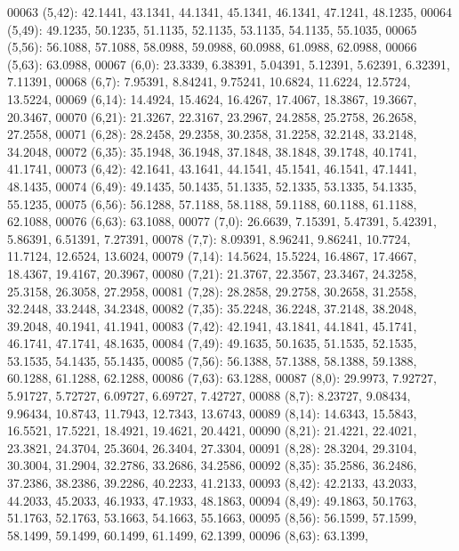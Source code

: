\begin{DoxyCode}
00063       (5,42): 42.1441, 43.1341, 44.1341, 45.1341, 46.1341, 47.1241, 48.1235,
00064       (5,49): 49.1235, 50.1235, 51.1135, 52.1135, 53.1135, 54.1135, 55.1035,
00065       (5,56): 56.1088, 57.1088, 58.0988, 59.0988, 60.0988, 61.0988, 62.0988,
00066       (5,63): 63.0988,
00067       (6,0): 23.3339, 6.38391, 5.04391, 5.12391, 5.62391, 6.32391, 7.11391,
00068       (6,7): 7.95391, 8.84241, 9.75241, 10.6824, 11.6224, 12.5724, 13.5224,
00069       (6,14): 14.4924, 15.4624, 16.4267, 17.4067, 18.3867, 19.3667, 20.3467,
00070       (6,21): 21.3267, 22.3167, 23.2967, 24.2858, 25.2758, 26.2658, 27.2558,
00071       (6,28): 28.2458, 29.2358, 30.2358, 31.2258, 32.2148, 33.2148, 34.2048,
00072       (6,35): 35.1948, 36.1948, 37.1848, 38.1848, 39.1748, 40.1741, 41.1741,
00073       (6,42): 42.1641, 43.1641, 44.1541, 45.1541, 46.1541, 47.1441, 48.1435,
00074       (6,49): 49.1435, 50.1435, 51.1335, 52.1335, 53.1335, 54.1335, 55.1235,
00075       (6,56): 56.1288, 57.1188, 58.1188, 59.1188, 60.1188, 61.1188, 62.1088,
00076       (6,63): 63.1088,
00077       (7,0): 26.6639, 7.15391, 5.47391, 5.42391, 5.86391, 6.51391, 7.27391,
00078       (7,7): 8.09391, 8.96241, 9.86241, 10.7724, 11.7124, 12.6524, 13.6024,
00079       (7,14): 14.5624, 15.5224, 16.4867, 17.4667, 18.4367, 19.4167, 20.3967,
00080       (7,21): 21.3767, 22.3567, 23.3467, 24.3258, 25.3158, 26.3058, 27.2958,
00081       (7,28): 28.2858, 29.2758, 30.2658, 31.2558, 32.2448, 33.2448, 34.2348,
00082       (7,35): 35.2248, 36.2248, 37.2148, 38.2048, 39.2048, 40.1941, 41.1941,
00083       (7,42): 42.1941, 43.1841, 44.1841, 45.1741, 46.1741, 47.1741, 48.1635,
00084       (7,49): 49.1635, 50.1635, 51.1535, 52.1535, 53.1535, 54.1435, 55.1435,
00085       (7,56): 56.1388, 57.1388, 58.1388, 59.1388, 60.1288, 61.1288, 62.1288,
00086       (7,63): 63.1288,
00087       (8,0): 29.9973, 7.92727, 5.91727, 5.72727, 6.09727, 6.69727, 7.42727,
00088       (8,7): 8.23727, 9.08434, 9.96434, 10.8743, 11.7943, 12.7343, 13.6743,
00089       (8,14): 14.6343, 15.5843, 16.5521, 17.5221, 18.4921, 19.4621, 20.4421,
00090       (8,21): 21.4221, 22.4021, 23.3821, 24.3704, 25.3604, 26.3404, 27.3304,
00091       (8,28): 28.3204, 29.3104, 30.3004, 31.2904, 32.2786, 33.2686, 34.2586,
00092       (8,35): 35.2586, 36.2486, 37.2386, 38.2386, 39.2286, 40.2233, 41.2133,
00093       (8,42): 42.2133, 43.2033, 44.2033, 45.2033, 46.1933, 47.1933, 48.1863,
00094       (8,49): 49.1863, 50.1763, 51.1763, 52.1763, 53.1663, 54.1663, 55.1663,
00095       (8,56): 56.1599, 57.1599, 58.1499, 59.1499, 60.1499, 61.1499, 62.1399,
00096       (8,63): 63.1399,

\end{DoxyCode}
